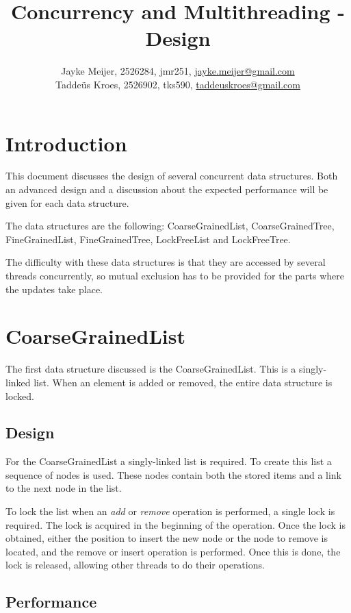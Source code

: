 \documentclass[a4paper]{article}
\title{Concurrency and Multithreading - Design}
\author{Jayke Meijer, 2526284, jmr251, \url{jayke.meijer@gmail.com} \\
Taddeüs Kroes, 2526902, tks590, \url{taddeuskroes@gmail.com}}
\begin{document}
\maketitle
\pagebreak

\tableofcontents
\pagebreak

\section{Introduction}

This document discusses the design of several concurrent data
structures. Both an advanced design and a discussion about the
expected performance will be given for each data structure.

The data structures are the following: CoarseGrainedList,
CoarseGrainedTree, FineGrainedList, FineGrainedTree,
LockFreeList and LockFreeTree.

The difficulty with these data structures is that they are
accessed by several threads concurrently, so mutual exclusion has
to be provided for the parts where the updates take place.

\section{CoarseGrainedList}

The first data structure discussed is the CoarseGrainedList.
This is a singly-linked list. When an element is added or removed,
the entire data structure is locked.

\subsection{Design}

For the CoarseGrainedList a singly-linked list is required. To create this
list a sequence of nodes is used. These nodes contain both the stored items
and a link to the next node in the list.

To lock the list when an \emph{add} or \emph{remove} operation is performed,
a single lock is required. The lock is acquired in the beginning of the
operation. Once the lock is obtained, either the position to insert the new
node or the node to remove is located, and the remove or insert operation is
performed. Once this is done, the lock is released, allowing
other threads to do their operations.

\subsection{Performance}
\end{document}
